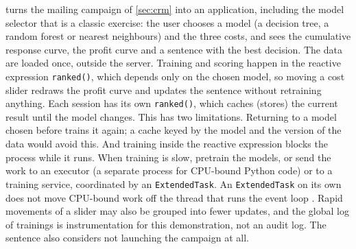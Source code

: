 turns the mailing campaign of \cref{sec:crm} into an application, including the model selector that is a
classic exercise: the user chooses a model (a decision tree, a random forest or nearest neighbours) and the three costs, and sees
the cumulative response curve, the profit curve and a sentence with the best decision. The data are loaded once, outside the server.
Training and scoring happen in the reactive expression \texttt{ranked()}, which depends only on the chosen model, so moving a cost
slider redraws the profit curve and updates the sentence without retraining anything. Each session has its own
\texttt{ranked()}, which caches (stores) the current result until the model changes. This has two limitations. Returning to a model chosen before trains it
again; a cache keyed by the model and the version of the data would avoid this. And training inside the reactive
expression blocks the process while it runs. When training is slow, pretrain the models, or send the work to an
executor (a separate process for CPU-bound Python code) or to a training service, coordinated by an \texttt{ExtendedTask}. An \texttt{ExtendedTask} on its own does not move CPU-bound work off the thread that runs the event loop \citep{shinypython2024}. Rapid movements of a slider may
also be grouped into fewer updates, and the global log of trainings is instrumentation for this demonstration, not an
audit log. The sentence also considers not launching the campaign at all.

